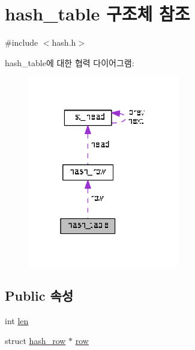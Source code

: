 \hypertarget{structhash__table}{\section{hash\+\_\+table 구조체 참조}
\label{structhash__table}
}


{\ttfamily \#include $<$hash.\+h$>$}



hash\+\_\+table에 대한 협력 다이어그램\+:
\nopagebreak
\begin{figure}[H]
\begin{center}
\leavevmode
\includegraphics[width=187pt]{structhash__table__coll__graph}
\end{center}
\end{figure}
\subsection*{Public 속성}
\begin{DoxyCompactItemize}
\item 
int \hyperlink{structhash__table_a5c37715c358be0aea139f968bd44d3ae}{len}
\item 
struct \hyperlink{structhash__row}{hash\+\_\+row} $\ast$ \hyperlink{structhash__table_a634ff501f78f223799d4923fbcbbf30d}{row}
\end{DoxyCompactItemize}


